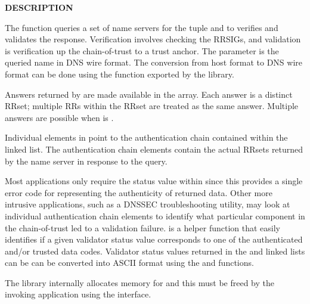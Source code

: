 {\bf DESCRIPTION}

The  function queries a set of name servers
for the  tuple and to verifies and
validates the response.  Verification involves checking the RRSIGs, and
validation is verification up the chain-of-trust to a trust anchor.  The
 parameter is the queried name in DNS wire format.  The
conversion from host format to DNS wire format can be done using the
 function exported by the  library.

Answers returned by  are made available in
the  array.  Each answer is a distinct RRset; multiple RRs
within the RRset are treated as the same answer.  Multiple answers are
possible when  is .

Individual elements in  point to the authentication chain
contained within the \\
 linked list.  The
authentication chain elements contain the actual RRsets returned by the name
server in response to the query.

Most applications only require the status value within  since
this provides a single error code for representing the authenticity of
returned data.  Other more intrusive applications, such as a DNSSEC
troubleshooting utility, may look at individual authentication chain elements
to identify what particular component in the chain-of-trust led to a
validation failure.   is a helper function that easily
identifies if a given validator status value corresponds to one of the
authenticated and/or trusted data codes.  Validator status values returned in
the  and  linked lists
can be can be converted into ASCII format using the 
and  functions.

The  library internally allocates memory for  and
this must be freed by the invoking application using the
 interface.

